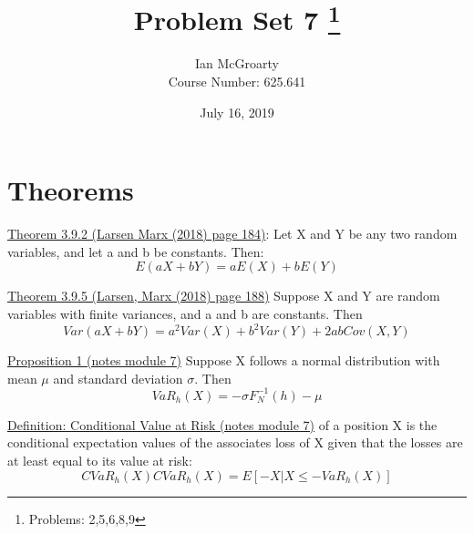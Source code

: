 \documentclass[12pt]{article}
\title{Problem Set 7 \thanks{Problems: 2,5,6,8,9}}
\author{Ian McGroarty \\
	Course Number: 625.641}
\date{July 16, 2019}
\begin{document}
\maketitle
\section{Theorems}
\underline{Theorem 3.9.2 (Larsen Marx (2018) page 184)}: Let X and Y be any two random variables, and let a and b be constants. Then: $$ E(aX+bY)=aE(X)+bE(Y)$$ 

\underline{Theorem 3.9.5 (Larsen, Marx (2018) page 188)} Suppose X and Y are random variables with finite variances, and a and b are constants. Then $$ Var(aX+bY) = a^2Var(X) + b^2Var(Y) + 2abCov(X,Y)$$

\underline{Proposition 1  (notes module 7)} Suppose X follows a normal distribution with mean $\mu $ and standard deviation $\sigma $. Then $$VaR_h(X) = -\sigma F_N^{-1}(h) - \mu $$

\underline{Definition: Conditional Value at Risk (notes module 7)} of a position X is the conditional expectation values of the associates loss of X given that the losses are at least equal to its value at risk: $$ CVaR_h(X) CVaR_h(X) = E[-X|X \leq - VaR_h(X)]$$
\end{document}
